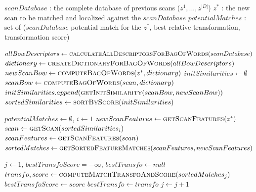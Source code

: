 \begin{algorithm}
    \begin{algorithmic}[1]
        \INPUT
        \Statex $scanDatabase$ : the complete database of previous scans ($z^1,...,z^{|D|}$)
        \Statex $z^*$ : the new scan to be matched and localized against the $scanDatabase$
        \OUTPUT
        \Statex $potentialMatches$ : set of ($scanDatabase$ potential match for the $z^*$, best relative transformation, transformation score)
        \Statex

        \State $allBowDescriptors \gets \textsc{calculateAllDescriptorsForBagOfWords}(scanDatabase)$ \label{alg:bow_beginning}
        \State $dictionary \gets \textsc{createDictionaryForBagOfWords}(allBowDescriptors)$ \label{alg:dictionary}
        \State
        \State $newScanBow \gets \textsc{computeBagOfWords}(z^*, dictionary)$  \label{alg:create_bow}
        \State \State $initSimilarities \gets \emptyset$ 
        \State $scanBow \gets \textsc{computeBagOfWords}(scan, dictionary)$ \label{alg:create_bow2}
        \State $initSimilarities.append(\textsc{getInitSimilarity}(scanBow, newScanBow))$ \label{alg:init_similarities}
        \EndFor
        \State $sortedSimilarities \gets \textsc{sortByScore}(initSimilarities)$ \label{alg:bow_end}

        \State
        \State $potentialMatches \gets \emptyset$, $i \gets 1$ \label{alg:correspondences_beginning}
        \State $newScanFeatures \gets \textsc{getScanFeatures}(z^*)$   \label{alg:features_1}
         \label{alg:timeout}
        \State $scan \gets \textsc{getScan}(sortedSimilarities_i)$
        \State $scanFeatures \gets \textsc{getScanFeatures}(scan)$  \label{alg:features_2}
        \State $sortedMatches \gets \textsc{getSortedFeatureMatches}(scanFeatures, newScanFeatures)$ \label{alg:ordered_matches}

        \State
        \State $j \gets 1$, $bestTransfoScore = -\infty$, $bestTransfo \gets null$
        \State $transfo,score \gets \textsc{computeMatchTransfoAndScore}(sortedMatches_j)$ \label{alg:transfo_score}
        \State $bestTransfoScore \gets score$
        \State $bestTransfo \gets transfo$
        \EndIf
        \State $j \gets j + 1$
        \EndWhile


\end{algorithmic}
\end{algorithm}
